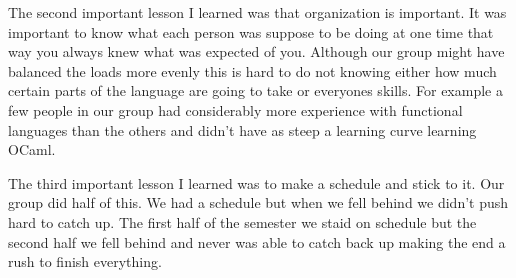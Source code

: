 The second important lesson I learned was that organization is important. It was important to know what each person was suppose 
to be doing at one time that way you always knew what was expected of you. Although our group might have balanced the loads more 
evenly this is hard to do not knowing either how much certain parts of the language are going to take or everyones skills. For 
example a few people in our group had considerably more experience with functional languages than the others and didn't have as 
steep a learning curve learning OCaml. 

The third important lesson I learned was to make a schedule and stick to it. Our group did half of this. We had a schedule but when 
we fell behind we didn't push hard to catch up. The first half of the semester we staid on schedule but the second half we fell 
behind and never was able to catch back up making the end a rush to finish everything. 
